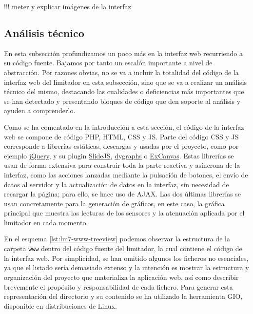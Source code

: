 !!! meter y explicar imágenes de la interfaz

\subsection{Análisis técnico}

En esta subsección profundizamos un poco más en la interfaz web recurriendo a su código fuente. Bajamos por tanto un escalón importante a nivel de abstracción. Por razones obvias, no se va a incluir la totalidad del código de la interfaz web del limitador en esta subsección, sino que se va a realizar un análisis técnico del mismo, destacando las cualidades o deficiencias más importantes que se han detectado y presentando bloques de código que den soporte al análisis y ayuden a comprenderlo.


Como se ha comentado en la introducción a esta sección, el código de la interfaz web se compone de código PHP, HTML, CSS y JS. Parte del código CSS y JS corresponde a librerías estáticas, descargas y usadas por el proyecto, como por ejemplo \href{https://jquery.com/}{jQuery}, y su plugin \href{https://nathansearles.github.io/slidesjs/}{SlideJS}, \href{https://dygraphs.com/}{dygraphs} o \href{https://github.com/arv/explorercanvas}{ExCanvas}. Estas librerías se usan de forma extensiva para construir toda la parte reactiva y asíncrona de la interfaz, como las acciones lanzadas mediante la pulsación de botones, el envío de datos al servidor y la actualización de datos en la interfaz, sin necesidad de recargar la página; para ello, se hace uso de AJAX. Las dos últimas librerías se usan concretamente para la generación de gráficos, en este caso, la gráfica principal que muestra las lecturas de los sensores y la atenuación aplicada por el limitador en cada momento.

En el esquema \ref{lst:lm7-www-treeview} podemos observar la estructura de la carpeta \verb|www| dentro del código fuente del limitador, la cual contiene el código de la interfaz web. Por simplicidad, se han omitido algunos los ficheros no esenciales, ya que el listado sería demasiado extenso y la intención es mostrar la estructura y organización del proyecto que materializa la aplicación web, así como describir brevemente el propósito y responsabilidad de cada fichero. Para generar esta representación del directorio y su contenido se ha utilizado la herramienta \acrshort{GIO}, disponible en distribuciones de Linux.\newline


